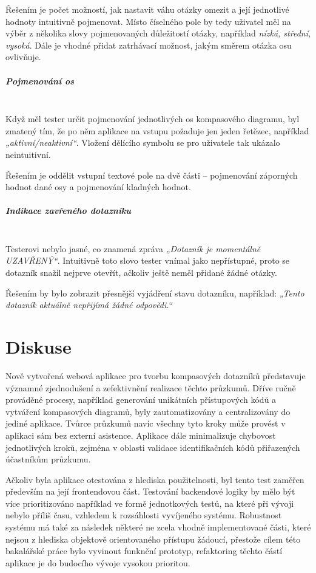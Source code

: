 Řešením je počet možností, jak nastavit váhu otázky omezit a její jednotlivé hodnoty intuitivně pojmenovat.
Místo číselného pole by tedy uživatel měl na výběr z několika slovy pojmenovaných důležitostí otázky,
například \textit{nízká, střední, vysoká}. Dále je vhodné přidat zatrhávací možnost, jakým směrem otázka osu ovlivňuje.

\paragraph{Pojmenování os}~\\
Když měl tester určit pojmenování jednotlivých os kompasového diagramu,
byl zmatený tím, že po něm aplikace na vstupu požaduje jen jeden řetězec, například
\textit{„aktivní/neaktivní“}. Vložení dělícího symbolu se pro uživatele tak ukázalo neintuitivní.

Řešením je oddělit vstupní textové pole na dvě části – pojmenování záporných
hodnot dané osy a pojmenování kladných hodnot.


\paragraph{Indikace zavřeného dotazníku}~\\
Testerovi nebylo jasné, co znamená zpráva \textit{„Dotazník je momentálně UZAVŘENÝ“}.
Intuitivně toto slovo tester vnímal jako nepřístupné, proto se dotazník snažil
nejprve otevřít, ačkoliv ještě neměl přidané žádné otázky.

Řešením by bylo zobrazit přesnější vyjádření stavu dotazníku, například: \textit{„Tento dotazník
aktuálně nepřijímá žádné odpovědi.“}

\chapter{Diskuse}
Nově vytvořená webová aplikace pro tvorbu kompasových dotazníků představuje
významné zjednodušení a zefektivnění realizace těchto průzkumů. Dříve ručně prováděné
procesy, například generování unikátních přístupových kódů a 
vytváření kompasových diagramů, byly zautomatizovány a centralizovány do jediné aplikace.
Tvůrce průzkumů navíc všechny tyto kroky může provést v aplikaci sám bez externí asistence.
Aplikace dále minimalizuje chybovost jednotlivých kroků, zejména v oblasti validace
identifikačních kódů přiřazených účastníkům průzkumu.

Ačkoliv byla aplikace otestována z hlediska použitelnosti, byl tento test 
zaměřen především na její frontendovou část. Testování backendové logiky
by mělo být více prioritizováno například ve formě jednotkových testů, na které
při vývoji nebylo příliš času, vzhledem k rozsáhlosti vyvíjeného systému. 
Robustnost systému má také za následek některé ne zcela vhodně implementované části,
které nejsou z hlediska objektově orientovaného přístupu žádoucí, přestože cílem
této bakalářské práce bylo vyvinout funknční prototyp, refaktoring těchto částí
aplikace je do budocího vývoje vysokou prioritou.

